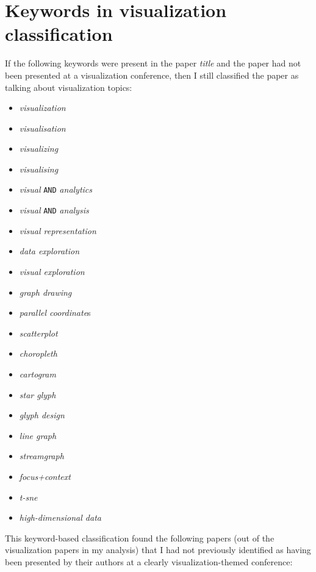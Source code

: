 \documentclass[conference]{vgtc}                     %
\begin{document}

%
%
%



\clearpage

\appendix %

\section{Keywords in visualization classification}
\label{app:keywords}

If the following keywords were present in the paper \emph{title} and the paper had not been presented at a visualization conference, then I still classified the paper as talking about visualization topics:
\begin{itemize}
\item \emph{visualization}
\item \emph{visualisation}
\item \emph{visualizing}
\item \emph{visualising}
\item \emph{visual} \texttt{AND} \emph{analytics}
\item \emph{visual} \texttt{AND} \emph{analysis}
\item \emph{visual representation}
\item \emph{data exploration}
\item \emph{visual exploration}
\item \emph{graph drawing}
\item \emph{parallel coordinate}s
\item \emph{scatterplot}
\item \emph{choropleth}
\item \emph{cartogram}
\item \emph{star glyph}
\item \emph{glyph design}
\item \emph{line graph}
\item \emph{streamgraph}
\item \emph{focus+context}
\item \emph{t-sne}
\item \emph{high-dimensional data}
\end{itemize}

This keyword-based classification found the following \GrsiVisByKeywordPapersCount{} papers (out of the \GrsiTotalVisPapers{} visualization papers in my analysis) that I had not previously identified as having been presented by their authors at a clearly visualization-themed conference:
\begin{itemize}

\end{itemize}
\end{document}
